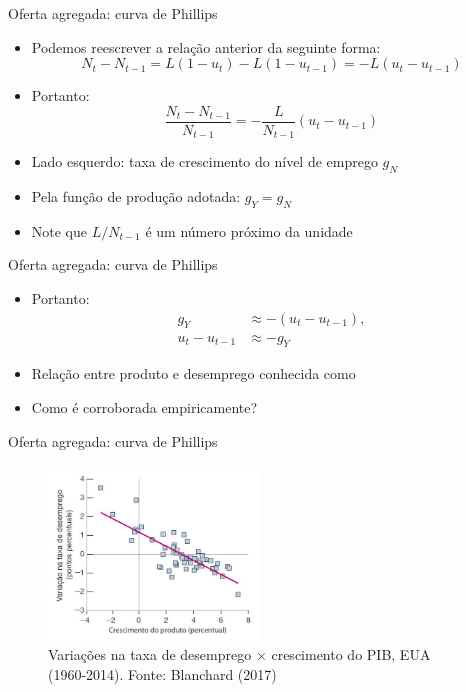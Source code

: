 \documentclass[10pt]{beamer}
\begin{document}
\begin{frame}
    {Oferta agregada: curva de Phillips}
    \begin{itemize}
        \item Podemos reescrever a relação anterior da seguinte forma:
        \[
          N_t - N_{t-1} = L(1 - u_t) - L(1 - u_{t-1}) = -L(u_t - u_{t-1})  
        \]
        \item Portanto:
        \[
            \frac{N_t - N_{t-1}}{N_{t-1}} = -\frac{L}{N_{t-1}}(u_t - u_{t-1})
        \]
        \item Lado esquerdo: taxa de crescimento do nível de emprego $g_N$\bigskip
        \item Pela função de produção adotada: $g_Y = g_N$\bigskip
        \item Note que $L/N_{t-1}$ é um número próximo da unidade
    \end{itemize}
\end{frame}

\begin{frame}
    {Oferta agregada: curva de Phillips}
    \begin{itemize}
        \item Portanto:
        \begin{align*}
          g_Y &\approx -(u_t - u_{t-1}), \\
          u_t - u_{t-1} &\approx - g_Y
        \end{align*}
        \item Relação entre produto e desemprego conhecida como \bigskip
        \item Como é corroborada empiricamente?
    \end{itemize}
\end{frame}

\begin{frame}
    {Oferta agregada: curva de Phillips}
    \begin{figure}
        \includegraphics[width=0.5\textwidth]{./figures/aula14_fig2.PNG}
        \caption{Variações na taxa de desemprego $\times$ crescimento do PIB, EUA (1960-2014). Fonte: Blanchard (2017)}
    \end{figure}
\end{frame}
\end{document}
